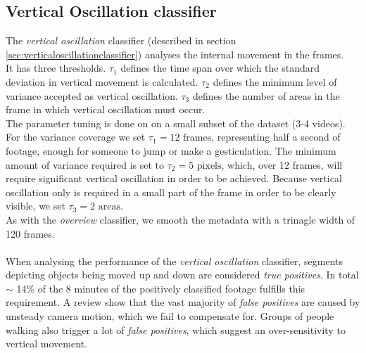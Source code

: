 \subsection{Vertical Oscillation classifier}
%
The \textit{vertical oscillation} classifier (described in section \ref{sec:verticaloscillationclassifier}) analyses the internal movement in the frames.\\
It has three thresholds. $\tau_1$ defines the time span over which the standard deviation in vertical movement is calculated. $\tau_2$ defines the minimum level of variance accepted as vertical oscillation. $\tau_3$ defines the number of areas in the frame in which vertical oscillation must occur.\\
The parameter tuning is done on on a small subset of the dataset (3-4 videos). For the variance coverage we set $\tau_1 = 12 \text{ frames}$, representing half a second of footage, enough for someone to jump or make a gesticulation. The minimum amount of variance required is set to $\tau_2 = 5 \text{ pixels}$, which, over 12 frames, will require significant vertical oscillation in order to be achieved. Because vertical oscillation only is required in a small part of the frame in order to be clearly visible, we set $\tau_3 = 2 \text{ areas}$.\\
As with the \textit{overview} classifier, we smooth the metadata with a trinagle width of 120 frames.\\
\\
When analysing the performance of the \textit{vertical oscillation} classifier, segments depicting objects being moved up and down are considered \textit{true positives}. In total $\sim$ 14\% of the 8 minutes of the positively classified footage fulfills this requirement. A review show that the vast majority of \textit{false positives} are caused by unsteady camera motion, which we fail to compensate for. Groups of people walking also trigger a lot of \textit{false positives}, which suggest an over-sensitivity to vertical movement.
%
%
